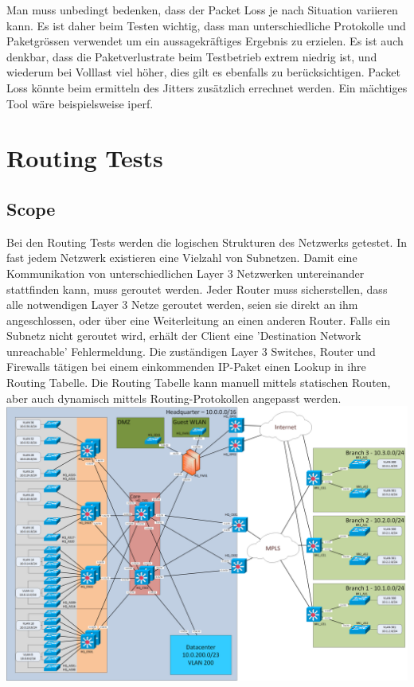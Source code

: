 \documentclass[a4,12pt]{scrartcl}
\begin{document}
\noindent Man muss unbedingt bedenken, dass der Packet Loss je nach Situation variieren kann. Es ist daher beim Testen wichtig, dass man unterschiedliche Protokolle und Paketgrössen verwendet um ein aussagekräftiges Ergebnis zu erzielen. Es ist auch denkbar, dass die Paketverlustrate beim Testbetrieb extrem niedrig ist, und wiederum bei Volllast viel höher, dies gilt es ebenfalls zu berücksichtigen. Packet Loss könnte beim ermitteln des Jitters zusätzlich errechnet werden. Ein mächtiges Tool wäre beispielsweise iperf.
\newpage
\section{Routing Tests}
\subsection{Scope}
Bei den Routing Tests werden die logischen Strukturen des Netzwerks getestet. In fast jedem Netzwerk existieren eine Vielzahl von Subnetzen. Damit eine Kommunikation von unterschiedlichen Layer 3 Netzwerken untereinander stattfinden kann, muss geroutet werden. Jeder Router muss sicherstellen, dass alle notwendigen Layer 3 Netze geroutet werden, seien sie direkt an ihm angeschlossen, oder über eine Weiterleitung an einen anderen Router. Falls ein Subnetz nicht geroutet wird, erhält der Client eine 'Destination Network unreachable' Fehlermeldung. Die zuständigen Layer 3 Switches, Router und Firewalls tätigen bei einem einkommenden IP-Paket einen Lookup in ihre Routing Tabelle. Die Routing Tabelle kann manuell mittels statischen Routen, aber auch dynamisch mittels Routing-Protokollen angepasst werden.\\

\includegraphics[width=1\textwidth]{figures/Netzwerk_logisch.png}\\
\end{document}
